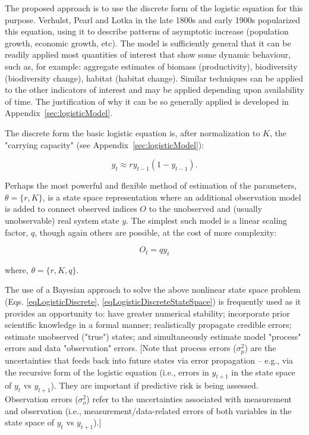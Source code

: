\documentclass[letterpaper,portrait,11pt]{scrartcl}
\numberwithin{equation}{section}    %
\numberwithin{figure}{section}    %
\numberwithin{table}{section}       %
\begin{document}
The proposed approach is to use the discrete form of the logistic equation for this purpose. Verhulst, Pearl and Lotka in the late 1800s and early 1900s popularized this equation, using it to describe patterns of asymptotic increase (population growth, economic growth, etc). The model is sufficiently general that it can be readily applied most quantities of interest that show some dynamic behaviour, such as, for example: aggregate estimates of biomass (productivity), biodiversity (biodiversity change), habitat (habitat change). Similar techniques can be applied to the other indicators of interest and may be applied depending upon availability of time. The justification of why it can be so generally applied is developed in Appendix~\ref{sec:logisticModel}.

The discrete form the basic logistic equation is, after normalization to $K$, the "carrying capacity" (see Appendix~\ref{sec:logisticModel}):

\begin{equation} 
\label{eqLogisticDiscrete}
y_t  \approx r y_{t-1} (1 - y_{t-1} ).
\end{equation}

Perhaps the most powerful and flexible method of estimation of the parameters, $\theta=\{r,K\}$, is a state space representation where an additional observation model is added to connect observed indices $O$ to the unobserved and (usually unobservable) real system state $y$. The simplest such model is a linear scaling factor, $q$, though again others are possible, at the cost of more complexity: 

\begin{equation} 
\label{eqLogisticDiscreteStateSpace}
O_t = q y_t
\end{equation}


where, $\theta=\{r,K,q\}$.

The use of a Bayesian approach to solve the above nonlinear state space problem (Eqs. \ref{eqLogisticDiscrete}, \ref{eqLogisticDiscreteStateSpace}) is frequently used as it provides an opportunity to: have greater numerical stability; incorporate prior scientific knowledge in a formal manner; realistically propagate credible errors; estimate unobserved ("true") states; and simultaneously estimate model "process" errors and data "observation" errors. [Note that process errors ($\sigma^2_p$) are the uncertainties that feeds back into future states via error propagation -- e.g., via the recursive form of the logistic equation (i.e., errors in $y_{t+1}$ in the state space of $y_t$ vs $y_{t+1}$). They are important if predictive risk is being assessed. Observation errors ($\sigma^2_o$) refer to the uncertainties associated with measurement and observation (i.e., measurement/data-related errors of both variables in the state space of $y_t$ vs $y_{t+1}$).]
\end{document}
